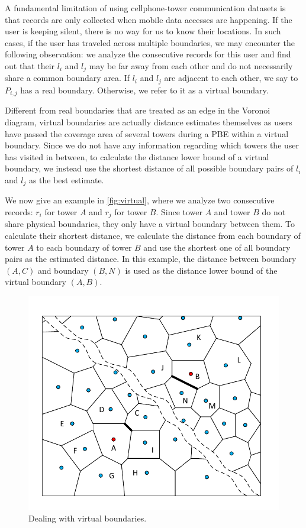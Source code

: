 A fundamental limitation of using cellphone-tower communication datasets is that records are only collected when mobile data accesses are happening. If the user is keeping silent, there is no way for us to know their locations. In such cases, if the user has traveled across multiple boundaries, we may encounter the following observation: we analyze the consecutive records for this user and find out that their $l_i$ and $l_j$  may be far away from each other and do not necessarily share a common boundary area. If $l_i$ and $l_j$ are adjacent to each other, we say to $P_{i,j}$ has a real boundary. Otherwise, we refer to it as a virtual boundary.

Different from real boundaries that are treated as an edge in the Voronoi diagram, virtual boundaries are actually distance estimates themselves as users have passed the coverage area of several towers during a PBE within a virtual boundary. Since we do not have any information regarding which towers the user has visited in between, to calculate the distance lower bound of a virtual boundary, we instead use the shortest distance of all possible boundary pairs of $l_i$ and $l_j$ as the best estimate.

We now give an example in \autoref{fig:virtual}, where we analyze two consecutive records: $r_i$ for tower $A$ and $r_j$ for tower $B$. Since tower $A$ and tower $B$ do not share physical boundaries, they only have a virtual boundary between them. To calculate their shortest distance, we calculate the distance from each boundary of tower $A$ to each boundary of tower $B$ and use the shortest one of all boundary pairs as the estimated distance. In this example, the distance between boundary $(A, C)$ and boundary $(B, N)$ is used as the distance lower bound of the virtual boundary $(A, B)$.

\begin{figure}[h]
    \centering
    \vspace{-0.1in}
    \includegraphics[width=0.9\linewidth]{./figures/virtual_boundary.pdf}
    \vspace{-0.2in}
    \caption{Dealing with virtual boundaries.}
		\label{fig:virtual}
\end{figure}

